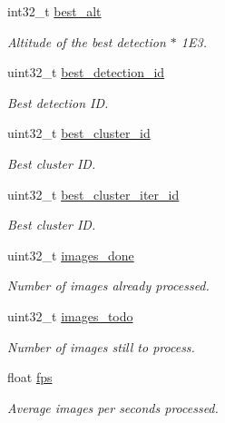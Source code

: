\begin{DoxyCompactItemize}
int32\+\_\+t \hyperlink{struct____mavlink__detection__stats__t_a4f022f4196632a548fda9a50e74e1883}{best\+\_\+alt}
\begin{DoxyCompactList}\small\item\em Altitude of the best detection $\ast$ 1\+E3. \end{DoxyCompactList}\item 
uint32\+\_\+t \hyperlink{struct____mavlink__detection__stats__t_a8516e7852119c2dabb38e7f3b9436d0d}{best\+\_\+detection\+\_\+id}
\begin{DoxyCompactList}\small\item\em Best detection I\+D. \end{DoxyCompactList}\item 
uint32\+\_\+t \hyperlink{struct____mavlink__detection__stats__t_af208b18b614a898ca7f75b57bd27341c}{best\+\_\+cluster\+\_\+id}
\begin{DoxyCompactList}\small\item\em Best cluster I\+D. \end{DoxyCompactList}\item 
uint32\+\_\+t \hyperlink{struct____mavlink__detection__stats__t_aa827161298480fbe83eae1bae9695ac1}{best\+\_\+cluster\+\_\+iter\+\_\+id}
\begin{DoxyCompactList}\small\item\em Best cluster I\+D. \end{DoxyCompactList}\item 
uint32\+\_\+t \hyperlink{struct____mavlink__detection__stats__t_ace2decc25407ced8c6d83e0789c2f131}{images\+\_\+done}
\begin{DoxyCompactList}\small\item\em Number of images already processed. \end{DoxyCompactList}\item 
uint32\+\_\+t \hyperlink{struct____mavlink__detection__stats__t_a662c03428bd35ed0704c1d13c935f401}{images\+\_\+todo}
\begin{DoxyCompactList}\small\item\em Number of images still to process. \end{DoxyCompactList}\item 
float \hyperlink{struct____mavlink__detection__stats__t_a45e8c045fa4fabc6cd423d42d46e793a}{fps}
\begin{DoxyCompactList}\small\item\em Average images per seconds processed. \end{DoxyCompactList}\end{DoxyCompactItemize}


